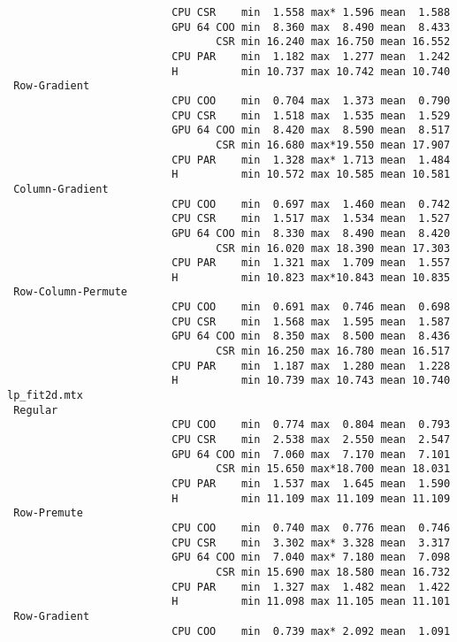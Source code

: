 {\begin{verbatim}
                          CPU CSR    min  1.558 max* 1.596 mean  1.588
                          GPU 64 COO min  8.360 max  8.490 mean  8.433
                                 CSR min 16.240 max 16.750 mean 16.552
                          CPU PAR    min  1.182 max  1.277 mean  1.242
                          H          min 10.737 max 10.742 mean 10.740
 Row-Gradient
                          CPU COO    min  0.704 max  1.373 mean  0.790
                          CPU CSR    min  1.518 max  1.535 mean  1.529
                          GPU 64 COO min  8.420 max  8.590 mean  8.517
                                 CSR min 16.680 max*19.550 mean 17.907
                          CPU PAR    min  1.328 max* 1.713 mean  1.484
                          H          min 10.572 max 10.585 mean 10.581
 Column-Gradient
                          CPU COO    min  0.697 max  1.460 mean  0.742
                          CPU CSR    min  1.517 max  1.534 mean  1.527
                          GPU 64 COO min  8.330 max  8.490 mean  8.420
                                 CSR min 16.020 max 18.390 mean 17.303
                          CPU PAR    min  1.321 max  1.709 mean  1.557
                          H          min 10.823 max*10.843 mean 10.835
 Row-Column-Permute
                          CPU COO    min  0.691 max  0.746 mean  0.698
                          CPU CSR    min  1.568 max  1.595 mean  1.587
                          GPU 64 COO min  8.350 max  8.500 mean  8.436
                                 CSR min 16.250 max 16.780 mean 16.517
                          CPU PAR    min  1.187 max  1.280 mean  1.228
                          H          min 10.739 max 10.743 mean 10.740
lp_fit2d.mtx
 Regular
                          CPU COO    min  0.774 max  0.804 mean  0.793
                          CPU CSR    min  2.538 max  2.550 mean  2.547
                          GPU 64 COO min  7.060 max  7.170 mean  7.101
                                 CSR min 15.650 max*18.700 mean 18.031
                          CPU PAR    min  1.537 max  1.645 mean  1.590
                          H          min 11.109 max 11.109 mean 11.109
 Row-Premute
                          CPU COO    min  0.740 max  0.776 mean  0.746
                          CPU CSR    min  3.302 max* 3.328 mean  3.317
                          GPU 64 COO min  7.040 max* 7.180 mean  7.098
                                 CSR min 15.690 max 18.580 mean 16.732
                          CPU PAR    min  1.327 max  1.482 mean  1.422
                          H          min 11.098 max 11.105 mean 11.101
 Row-Gradient
                          CPU COO    min  0.739 max* 2.092 mean  1.091

\end{verbatim}}
